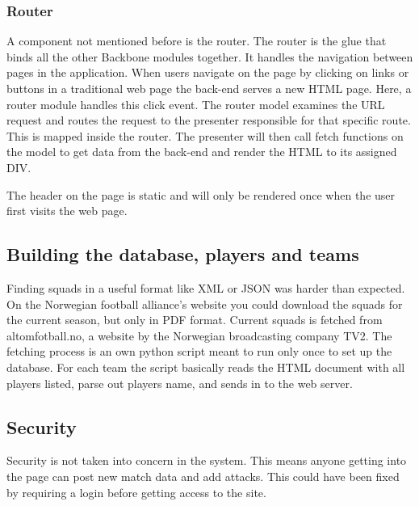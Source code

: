

\subsubsection{Router}

A component not mentioned before is the router. The router is the glue that binds all the other Backbone modules together. It handles the navigation between pages in the application. When users navigate on the page by clicking on links or buttons in a traditional web page the back-end serves a new HTML page. Here, a router module handles this click event. The router model examines the URL request and routes the request to the presenter responsible for that specific route. This is mapped inside the router. The presenter will then call fetch functions on the model to get data from the back-end and render the HTML to its assigned DIV.

The header on the page is static and will only be rendered once when the user first visits the web page. 

\subsection{Building the database, players and teams}

Finding squads in a useful format like \ac{XML} or \ac{JSON} was harder than expected. On the Norwegian football alliance's website you could download the squads for the current season, but only in PDF format. Current squads is fetched from altomfotball.no, a website by the Norwegian broadcasting company TV2. The fetching process is an own python script meant to run only once to set up the database. For each team the script basically reads the HTML document with all players listed, parse out players name, and sends in to the web server.

\subsection{Security}
Security is not taken into concern in the system. This means anyone getting into the page can post new match data and add attacks. This could have been fixed by requiring a login before getting access to the site. 







